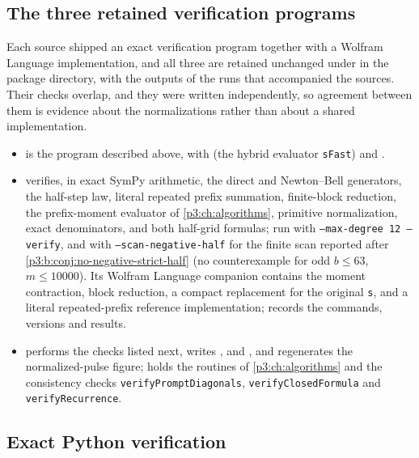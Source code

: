 \documentclass[11pt,oneside]{article}
\numberwithin{equation}{section}
\theoremstyle{definition}
\theoremstyle{remark}
\begin{document}
\subsection{The three retained verification programs}
Each source shipped an exact verification program together with a Wolfram
Language implementation, and all three are retained unchanged under
 in the package directory, with the outputs of the runs
that accompanied the sources. Their checks overlap, and they were written
independently, so agreement between them is evidence about the
normalizations rather than about a shared implementation.
\begin{itemize}
\item {} is the program described
above, with  (the hybrid evaluator
\texttt{sFast}) and .
\item {} verifies, in
exact SymPy arithmetic, the direct and Newton--Bell generators, the
half-step law, literal repeated prefix summation, finite-block reduction,
the prefix-moment evaluator of \cref{p3:ch:algorithms}, primitive normalization,
exact denominators, and both half-grid formulas; run with
\texttt{--max-degree 12 --verify}, and with \texttt{--scan-negative-half}
for the finite scan reported after \cref{p3:b:conj:no-negative-strict-half}
(no counterexample for odd $b\le63$, $m\le10000$). Its Wolfram Language
companion  contains the moment contraction,
block reduction, a compact replacement for the original \texttt{s}, and a
literal repeated-prefix reference implementation; 
records the commands, versions and results.
\item {} performs the checks
listed next, writes ,
 and
, and regenerates the normalized-pulse
figure;  holds the routines of
\cref{p3:ch:algorithms} and the consistency checks
\texttt{verifyPromptDiagonals}, \texttt{verifyClosedFormula} and
\texttt{verifyRecurrence}.
\end{itemize}

\subsection{Exact Python verification}
\end{document}

